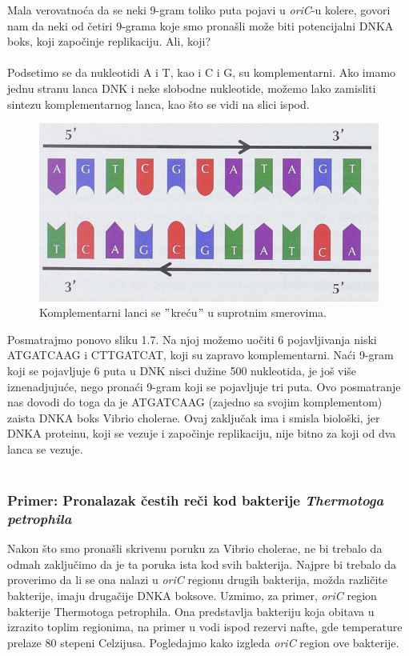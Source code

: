 Mala verovatnoća da se neki 9-gram toliko puta pojavi u \textit{oriC}-u kolere, govori nam da neki od četiri 9-grama koje smo pronašli može biti potencijalni DNKA boks, koji započinje replikaciju. Ali, koji?\\\\

Podsetimo se da nukleotidi A i T, kao i C i G, su komplementarni. Ako imamo jednu stranu lanca DNK i neke slobodne nukleotide, možemo lako zamisliti sintezu komplementarnog lanca, kao što se vidi na slici ispod. 

\begin{figure}[h]
\caption{Komplementarni lanci se $"$kreću$"$ u suprotnim smerovima.}
\centering
\includegraphics[width=1\textwidth]{poglavlja/1/slike/Komplementarni.png}
\end{figure} 

Posmatrajmo ponovo sliku 1.7. Na njoj možemo uočiti 6 pojavljivanja niski ATGATCAAG i CTTGATCAT, koji su zapravo komplementarni. Naći 9-gram koji se pojavljuje 6 puta u DNK nisci dužine 500 nukleotida, je još više iznenadjujuće, nego pronaći 9-gram koji se pojavljuje tri puta. Ovo posmatranje nas dovodi do toga da je ATGATCAAG (zajedno sa svojim komplementom) zaista DNKA boks Vibrio cholerae. Ovaj zaključak ima i smisla biološki, jer DNKA proteinu, koji se vezuje i započinje replikaciju, nije bitno za koji od dva lanca se vezuje.\\\\

\subsubsection{Primer: Pronalazak čestih reči kod bakterije \textit{Thermotoga petrophila}} 

Nakon što smo pronašli skrivenu poruku za Vibrio cholerae, ne bi trebalo da odmah zaključimo da je ta poruka ista kod svih bakterija. Najpre bi trebalo da proverimo da li se ona nalazi u \textit{oriC} regionu drugih bakterija, možda različite bakterije, imaju drugačije DNKA boksove. Uzmimo, za primer, \textit{oriC} region bakterije Thermotoga petrophila. Ona predstavlja bakteriju koja obitava u izrazito toplim regionima, na primer u vodi ispod rezervi nafte, gde temperature prelaze 80 stepeni Celzijusa. Pogledajmo kako izgleda \textit{oriC} region ove bakterije.

